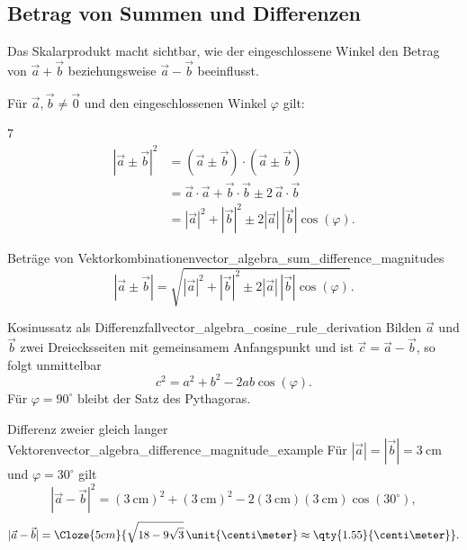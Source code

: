 \subsection{Betrag von Summen und Differenzen}
\label{subsec:vector_algebra_magnitude_sums_differences}

Das Skalarprodukt macht sichtbar, wie der eingeschlossene Winkel den Betrag
von $\vec a+\vec b$ beziehungsweise $\vec a-\vec b$ beeinflusst.

\begin{center}
\end{center}

Für $\vec a,\vec b\ne\vec 0$ und den eingeschlossenen Winkel $\varphi$ gilt:
\begin{ClozeArea}[34]{7}
  \[
    \begin{aligned}
      |\vec a\pm\vec b|^2
      &=(\vec a\pm\vec b)\cdot(\vec a\pm\vec b)\\[0.5em]
      &=\vec a\cdot\vec a+\vec b\cdot\vec b
        \pm2\,\vec a\cdot\vec b\\[0.5em]
      &=|\vec a|^2+|\vec b|^2
        \pm2|\vec a|\,|\vec b|\cos(\varphi).
    \end{aligned}
  \]
\end{ClozeArea}

\begin{KeyPointBox}{Beträge von Vektorkombinationen}{vector_algebra_sum_difference_magnitudes}
  \[
    \boxed{
      |\vec a\pm\vec b|
      =\sqrt{|\vec a|^2+|\vec b|^2
        \pm2|\vec a|\,|\vec b|\cos(\varphi)}
    }.
  \]
\end{KeyPointBox}

\begin{KeyPointBox}{Kosinussatz als Differenzfall}{vector_algebra_cosine_rule_derivation}
  Bilden $\vec a$ und $\vec b$ zwei Dreiecksseiten mit gemeinsamem
  Anfangspunkt und ist $\vec c=\vec a-\vec b$, so folgt unmittelbar
  \[
    \boxed{c^2=a^2+b^2-2ab\cos(\varphi)}.
  \]
  Für $\varphi=90^\circ$ bleibt der Satz des Pythagoras.
\end{KeyPointBox}

\begin{ExampleBox}{Differenz zweier gleich langer Vektoren}{vector_algebra_difference_magnitude_example}
  Für $|\vec a|=|\vec b|=\qty{3}{\centi\meter}$ und
  $\varphi=30^\circ$ gilt
  \[
    |\vec a-\vec b|^2
    =(\qty{3}{\centi\meter})^2+(\qty{3}{\centi\meter})^2
    -2(\qty{3}{\centi\meter})(\qty{3}{\centi\meter})\cos(30^\circ),
  \]
  \[
    |\vec a-\vec b|
    =\Cloze{5cm}{\sqrt{18-9\sqrt3}\,\unit{\centi\meter}
      \approx\qty{1.55}{\centi\meter}}.
  \]
\end{ExampleBox}
